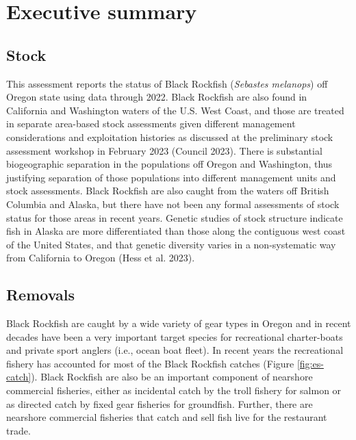 \documentclass[11pt,
  english,
  letterpaper,
]{article}
\begin{document}
\newpage

\hypertarget{executive-summary}{%
\section*{Executive summary}\label{executive-summary}}

\hypertarget{stock}{%
\subsection*{Stock}\label{stock}}

This assessment reports the status of Black Rockfish (\emph{Sebastes melanops}) off Oregon state using data through 2022. Black Rockfish are also found in California and Washington waters of the U.S. West Coast, and those are treated in separate area-based stock assessments given different management considerations and exploitation histories as discussed at the preliminary stock assessment workshop in February 2023 (Council 2023). There is substantial biogeographic separation in the populations off Oregon and Washington, thus justifying separation of those populations into different management units and stock assessments. Black Rockfish are also caught from the waters off British Columbia and Alaska, but there have not been any formal assessments of stock status for those areas in recent years. Genetic studies of stock structure indicate fish in Alaska are more differentiated than those along the contiguous west coast of the United States, and that genetic diversity varies in a non-systematic way from California to Oregon (Hess et al. 2023).

\hypertarget{removals}{%
\subsection*{Removals}\label{removals}}

Black Rockfish are caught by a wide variety of gear types in Oregon and in recent decades have been a very important target species for recreational charter-boats and private sport anglers (i.e., ocean boat fleet). In recent years the recreational fishery has accounted for most of the Black Rockfish catches (Figure \ref{fig:es-catch}). Black Rockfish are also be an important component of nearshore commercial fisheries, either as incidental catch by the troll fishery for salmon or as directed catch by fixed gear fisheries for groundfish. Further, there are nearshore commercial fisheries that catch and sell fish live for the restaurant trade.
\end{document}
